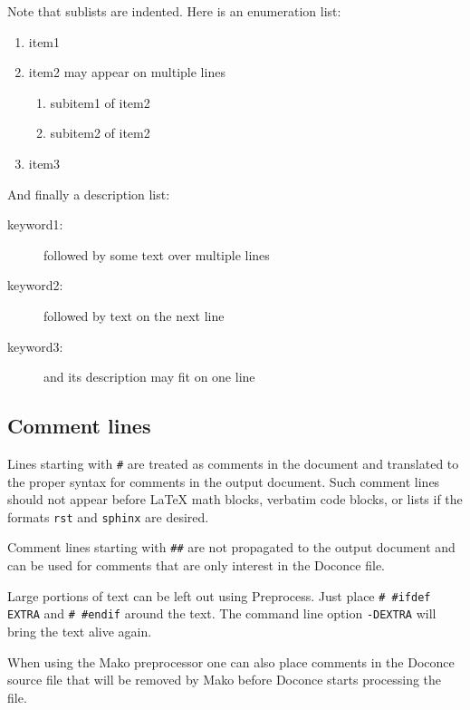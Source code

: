 \documentclass[%
oneside,                 %
final,                   %
10pt]{article}
\begin{document}
\noindent
Note that sublists are indented.
Here is an enumeration list:

\begin{enumerate}
\item item1

\item item2
   may appear on
   multiple lines
\begin{enumerate}

 \item subitem1 of item2

 \item subitem2 of item2

\end{enumerate}

\noindent
\item item3
\end{enumerate}

\noindent
And finally a description list:

\begin{description}
 \item[keyword1:] 
   followed by
   some text
   over multiple
   lines

 \item[keyword2:] 
   followed by text on the next line

 \item[keyword3:] 
   and its description may fit on one line
\end{description}

\noindent
\subsection{Comment lines}

Lines starting with \Verb!#! are treated as comments in the document and
translated to the proper syntax for comments in the output
document. Such comment lines should not appear before {\LaTeX} math
blocks, verbatim code blocks, or lists if the formats \Verb!rst! and
\Verb!sphinx! are desired.

Comment lines starting with \Verb!##! are not propagated to the output
document and can be used for comments that are only interest in
the Doconce file.

Large portions of text can be left out using Preprocess. Just place
\Verb!# #ifdef EXTRA! and \Verb!# #endif! around the text. The command line
option \Verb!-DEXTRA! will bring the text alive again.

When using the Mako preprocessor one can also place comments in
the Doconce source file that will be removed by Mako before
Doconce starts processing the file.
\end{document}
